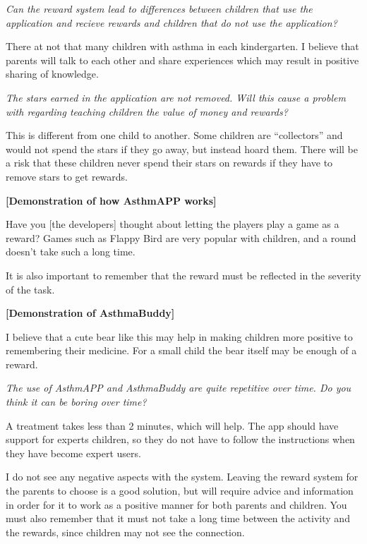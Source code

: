 \emph{Can the reward system lead to differences between children that use the application and recieve rewards and children that do not use the application?} 

There at not that many children with asthma in each kindergarten. I believe that parents will talk to each other and share experiences which may result in positive sharing of knowledge. 


\emph{The stars earned in the application are not removed. Will this cause a problem with regarding teaching children the value of money and rewards?}

This is different from one child to another. Some children are ``collectors'' and would not spend the stars if they go away, but instead hoard them. There will be a risk that these children never spend their stars on rewards if they have to remove stars to get rewards.

\textbf{[Demonstration of how AsthmAPP works]}

Have you [the developers] thought about letting the players play a game as a reward? Games such as Flappy Bird  are very popular with children, and a round doesn't take such a long time. 


It is also important to remember that the reward must be reflected in the severity of the task. 

\textbf{[Demonstration of AsthmaBuddy]}

I believe that a cute bear like this may help in making children more positive to remembering their medicine. For a small child the bear itself may be enough of a reward.


\emph{The use of AsthmAPP and AsthmaBuddy are quite repetitive over time. Do you think it can be boring over time?}

A treatment takes less than 2 minutes, which will help. The app should have support for experts children, so they do not have to follow the instructions when they have become expert users. 

I do not see any negative aspects with the system. Leaving the reward system for the parents to choose is a good solution, but will require advice and information in order for it to work as a positive manner for both parents and children. 
You must also remember that it must not take a long time between the activity and the rewards, since children may not see the connection.

